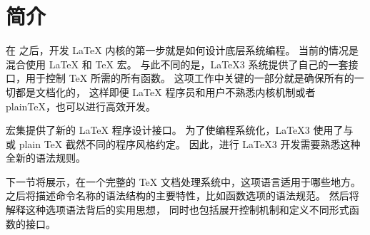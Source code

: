 \documentclass[full]{l3doc}
\begin{document}
%
\section{简介}
%
%

在 \LaTeXe{} 之后，开发 \LaTeX{} 内核的第一步就是如何设计底层系统编程。
当前的情况是混合使用 \LaTeX{} 和 \TeX{} 宏。
与此不同的是，\LaTeX3 系统提供了自己的一套接口，用于控制 \TeX{} 所需的所有函数。
这项工作中关键的一部分就是确保所有的一切都是文档化的，
这样即便 \LaTeX{} 程序员和用户不熟悉内核机制或者 plain\TeX{}，也可以进行高效开发。

%

 宏集提供了新的 \LaTeX{} 程序设计接口。
为了使编程系统化，\LaTeX3 使用了与 \LaTeXe{} 或 plain \TeX{} 截然不同的程序风格约定。
因此，进行 \LaTeX3 开发需要熟悉这种全新的语法规则。

%

下一节将展示，在一个完整的 \TeX{} 文档处理系统中，这项语言适用于哪些地方。
之后将描述命令名称的语法结构的主要特性，比如函数选项的语法规范。
然后将解释这种选项语法背后的实用思想，
同时也包括展开控制机制和定义不同形式函数的接口。
%
\end{document}
